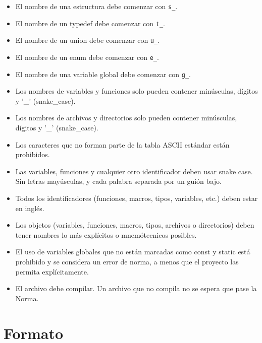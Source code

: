 \documentclass{42-es}
\begin{document}
\begin{itemize}

      \item El nombre de una estructura debe comenzar con \texttt{s\_}.
      \item El nombre de un typedef debe comenzar con \texttt{t\_}.
      \item El nombre de un union debe comenzar con \texttt{u\_}.
      \item El nombre de un enum debe comenzar con \texttt{e\_}.
      \item El nombre de una variable global debe comenzar con \texttt{g\_}.
      \item Los nombres de variables y funciones solo pueden contener
            minúsculas, dígitos y '\_' (snake\_case).
      \item Los nombres de archivos y directorios solo pueden contener
            minúsculas, dígitos y '\_' (snake\_case).
      \item Los caracteres que no forman parte de la tabla ASCII estándar están
            prohibidos.
      \item Las variables, funciones y cualquier otro identificador deben usar
            snake case. Sin letras mayúsculas, y cada palabra separada por un
            guión bajo.
      \item Todos los identificadores (funciones, macros, tipos, variables,
            etc.)
            deben estar en inglés.
      \item Los objetos (variables, funciones, macros, tipos, archivos o
            directorios) deben tener nombres lo más explícitos o mnemótecnicos
            posibles.
      \item El uso de variables globales que no están marcadas como const y
            static está prohibido y se considera un error de norma, a menos que
            el proyecto las permita explícitamente.
      \item El archivo debe compilar. Un archivo que no compila no se espera
            que
            pase la Norma.
\end{itemize}
\newpage

\section{Formato}
\end{document}
